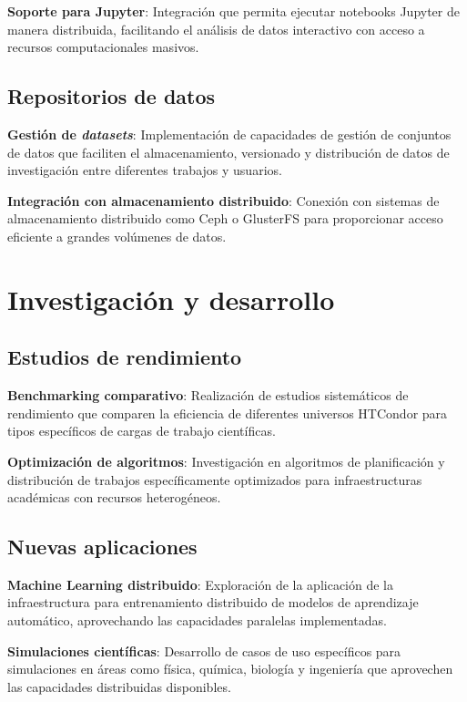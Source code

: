 \textbf{Soporte para Jupyter}: Integración que permita ejecutar notebooks Jupyter de manera distribuida, facilitando el análisis de datos interactivo con acceso a recursos computacionales masivos.

\subsection{Repositorios de datos}
\noindent

\textbf{Gestión de \textit{datasets}}: Implementación de capacidades de gestión de conjuntos de datos que faciliten el almacenamiento, versionado y distribución de datos de investigación entre diferentes trabajos y usuarios.

\textbf{Integración con almacenamiento distribuido}: Conexión con sistemas de almacenamiento distribuido como Ceph o GlusterFS para proporcionar acceso eficiente a grandes volúmenes de datos.

\section{Investigación y desarrollo}
\noindent

\subsection{Estudios de rendimiento}
\noindent

\textbf{Benchmarking comparativo}: Realización de estudios sistemáticos de rendimiento que comparen la eficiencia de diferentes universos HTCondor para tipos específicos de cargas de trabajo científicas.

\textbf{Optimización de algoritmos}: Investigación en algoritmos de planificación y distribución de trabajos específicamente optimizados para infraestructuras académicas con recursos heterogéneos.

\subsection{Nuevas aplicaciones}
\noindent

\textbf{Machine Learning distribuido}: Exploración de la aplicación de la infraestructura para entrenamiento distribuido de modelos de aprendizaje automático, aprovechando las capacidades paralelas implementadas.

\textbf{Simulaciones científicas}: Desarrollo de casos de uso específicos para simulaciones en áreas como física, química, biología y ingeniería que aprovechen las capacidades distribuidas disponibles.


